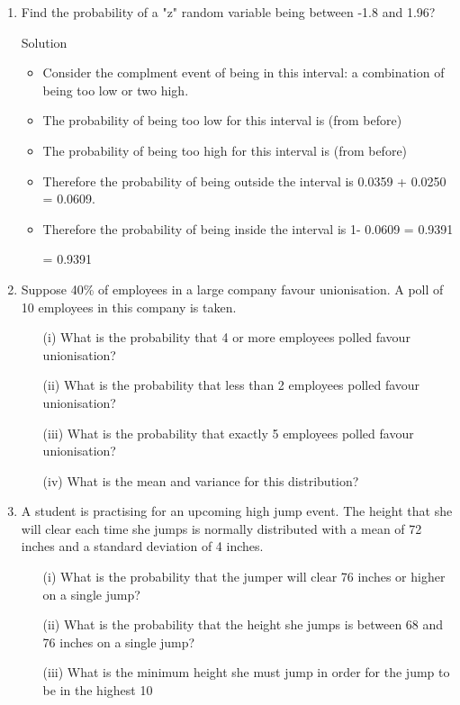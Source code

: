 \documentclass[a4paper,12pt]{article}
\begin{document}
\begin{enumerate}

\item 
Find the probability of a "z" random variable being between -1.8 and 1.96?

\begin{framed}
Solution 
\begin{itemize}


\item Consider the complment event of being in this interval: a combination of being too low or two high. 

\item The probability of being too low for this interval is    (from before)

\item The probability of being too high for this interval is    (from before)

\item Therefore the probability of being outside the interval is  0.0359 + 0.0250 = 0.0609.

\item Therefore the probability of being inside the interval is 1- 0.0609 = 0.9391

  = 0.9391
\end{itemize}

\end{framed}


\item Suppose 40\% of employees in a large company favour unionisation.  A poll of 10 employees in this company is taken.  
 \begin{itemize}
\item[(i)]  What is the probability that 4 or more employees polled favour unionisation? 
\item[(ii)]  What is the probability that less than 2 employees polled favour unionisation?
\item[(iii)]  What is the probability that exactly 5 employees polled favour unionisation?
\item[(iv)]  What is the mean and variance for this distribution?
\end{itemize}	

\item A student is practising for an upcoming high jump event.  The height that she will clear each time she jumps is normally distributed with a 
mean of 72 inches and a standard deviation of 4 inches.  
\begin{itemize}
\item[(i)]  What is the probability that the jumper will clear 76 inches or higher on a single jump?
\item[(ii)]  What is the probability that the height she jumps is between 68 and 76 inches on a single jump?
\item[(iii)]  What is the minimum height she must jump in order for the jump to be in the highest 10%
\end{itemize}
    

\end{enumerate}
\end{document}
